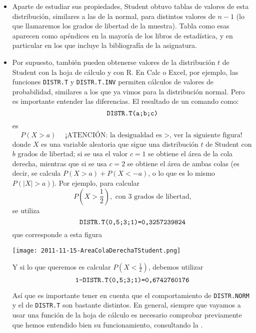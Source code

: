     \begin{itemize}
     \item Aparte de estudiar sus propiedades, Student obtuvo tablas de valores de esta distribución, similares a las de la normal, para distintos valores de $n-1$ (lo que llamaremos los {\sf grados de libertad} de la muestra).  Tabla como esas aparecen como apéndices en la mayoría de los libros de estadística, y en particular en los que incluye la bibliografía de la asignatura.

     \item Por supuesto, también pueden obtenerse valores de la distribución $t$ de Student con la hoja de cálculo y con R. En Calc o Excel, por ejemplo, las funciones {\tt DISTR.T} y {\tt DISTR.T.INV} permiten cálculos de valores de probabilidad, similares a los que ya vimos para la distribución normal. Pero es importante entender las diferencias. El resultado de un comando como:
         \[\mbox{\tt DISTR.T(a;b;c)}\]
         es
         \[P(X>a)\quad\mbox{¡ATENCIÓN: la desigualdad es $>$, ver la siguiente figura!}\]
         donde $X$ es una variable aleatoria que sigue una distribución $t$ de Student con $b$ grados de libertad; si se usa el valor $c=1$ se obtiene el área de la cola derecha, mientras que si se usa $c=2$ se obtiene el área de ambas colas (es decir, se calcula $P(X>a)+P(X<-a)$, o lo que es lo mismo $P(|X|>a)$). Por ejemplo, para calcular
         \[P(X>\frac{1}{2}),\mbox{ con 3 grados de libertad,}\]
         se utiliza
         \[\mbox{\tt DISTR.T(0,5;3;1)=0,3257239824}\]
         que corresponde a esta figura
         \begin{center}
         \texttt{[image: 2011-11-15-AreaColaDerechaTStudent.png]}
         \end{center}
         Y si lo que queremos es calcular $P(X<\frac{1}{2})$, debemos utilizar
         \[\mbox{\tt 1-DISTR.T(0,5;3;1)=0,6742760176}\]

         {\sf Así que es importante tener en cuenta que el comportamiento de {\tt DISTR.NORM} y el de {\tt DISTR.T} son bastante distintos.} En general, siempre que vayamos a usar una función de la hoja de cálculo es necesario comprobar previamente que hemos entendido bien su funcionamiento, consultando la .


\end{itemize}
